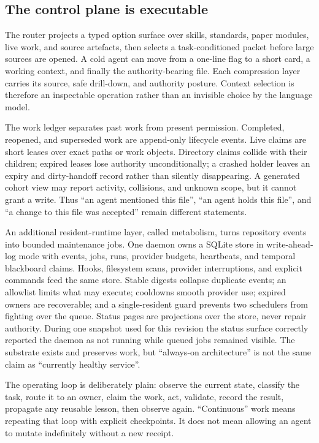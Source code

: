 \documentclass[10pt]{article}
\begin{document}
\subsection{The control plane is executable}

The router projects a typed option surface over skills, standards, paper
modules, live work, and source artefacts, then
selects a task-conditioned packet before large sources are opened. A cold
agent can move from a one-line flag to a short card, a working context, and
finally the authority-bearing file. Each compression layer carries its source,
safe drill-down, and authority posture. Context selection is therefore an
inspectable operation rather than an invisible choice by the language model.

The work ledger separates past work from present permission. Completed,
reopened, and superseded work are append-only lifecycle events. Live claims are
short leases over exact paths or work objects. Directory claims collide with
their children; expired leases lose authority unconditionally; a crashed
holder leaves an expiry and dirty-handoff record rather than silently
disappearing. A generated cohort view may report activity, collisions, and
unknown scope, but it cannot grant a write. Thus ``an agent mentioned this
file'', ``an agent holds this file'', and ``a change to this file was accepted''
remain different statements.

An additional resident-runtime layer, called metabolism, turns repository
events into bounded maintenance jobs. One daemon owns a SQLite store in
write-ahead-log mode with events, jobs, runs, provider budgets, heartbeats, and
temporal blackboard claims. Hooks, filesystem scans, provider interruptions,
and explicit commands feed the same store. Stable digests collapse duplicate
events; an allowlist limits what may execute; cooldowns smooth provider use;
expired owners are recoverable; and a single-resident guard prevents two
schedulers from fighting over the queue. Status pages are projections over the
store, never repair authority. During one snapshot used for this revision the
status surface correctly reported the daemon as not running while queued jobs
remained visible. The substrate exists and preserves work, but ``always-on
architecture'' is not the same claim as ``currently healthy service''.

The operating loop is deliberately plain: observe the current state, classify
the task, route it to an owner, claim the work, act, validate, record the
result, propagate any reusable lesson, then observe again. ``Continuous'' work
means repeating that loop with explicit checkpoints. It does not mean allowing
an agent to mutate indefinitely without a new receipt.
\end{document}

